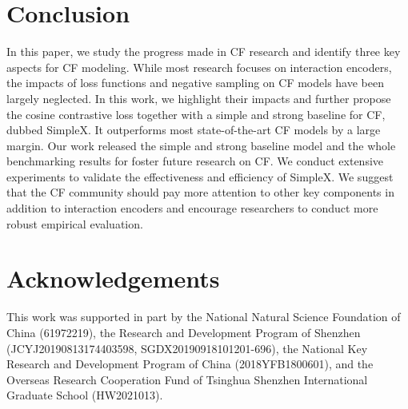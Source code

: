 \documentclass[sigconf,authorversion]{acmart}
\begin{document}
 \section{Conclusion}\label{sec:conclusion}
In this paper, we study the progress made in CF research and identify three key aspects for CF modeling. While most research focuses on interaction encoders, the impacts of loss functions and negative sampling on CF models have been largely neglected. In this work, we highlight their impacts and further propose the cosine contrastive loss together with a simple and strong baseline for CF, dubbed SimpleX. It outperforms most state-of-the-art CF models by a large margin. Our work released the simple and strong baseline model and the whole benchmarking results for foster future research on CF. We conduct extensive experiments to validate the effectiveness and efficiency of SimpleX. We suggest that the CF community should pay more attention to other key components in addition to interaction encoders and encourage researchers to conduct more robust empirical evaluation. 


\section{Acknowledgements}
This work was supported in part by the National Natural Science Foundation of China (61972219), the Research and Development Program of Shenzhen (JCYJ20190813174403598, SGDX20190918101201-696), the National Key Research and Development Program of China (2018YFB1800601), and the Overseas Research Cooperation Fund of Tsinghua Shenzhen International Graduate School
(HW2021013). 



\balance

\end{document}
